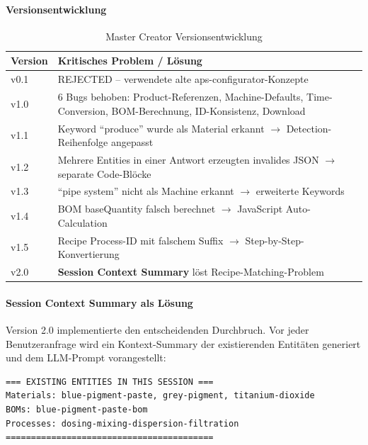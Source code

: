 \paragraph{Versionsentwicklung}

\begin{table}[h]
\centering
\caption{Master Creator Versionsentwicklung}
\label{tab:MasterCreatorVersions}
\begin{tabular}{lp{10cm}}
\hline
\textbf{Version} & \textbf{Kritisches Problem / Lösung} \\
\hline
v0.1 & REJECTED -- verwendete alte aps-configurator-Konzepte \\
v1.0 & 6 Bugs behoben: Product-Referenzen, Machine-Defaults, Time-Conversion, BOM-Berechnung, ID-Konsistenz, Download \\
v1.1 & Keyword ``produce'' wurde als Material erkannt $\rightarrow$ Detection-Reihenfolge angepasst \\
v1.2 & Mehrere Entities in einer Antwort erzeugten invalides JSON $\rightarrow$ separate Code-Blöcke \\
v1.3 & ``pipe system'' nicht als Machine erkannt $\rightarrow$ erweiterte Keywords \\
v1.4 & BOM baseQuantity falsch berechnet $\rightarrow$ JavaScript Auto-Calculation \\
v1.5 & Recipe Process-ID mit falschem Suffix $\rightarrow$ Step-by-Step-Konvertierung \\
v2.0 & \textbf{Session Context Summary} löst Recipe-Matching-Problem \\
\hline
\end{tabular}
\end{table}

\paragraph{Session Context Summary als Lösung}

Version 2.0 implementierte den entscheidenden Durchbruch. Vor jeder Benutzeranfrage wird ein Kontext-Summary der existierenden Entitäten generiert und dem LLM-Prompt vorangestellt:

\begin{verbatim}
=== EXISTING ENTITIES IN THIS SESSION ===
Materials: blue-pigment-paste, grey-pigment, titanium-dioxide
BOMs: blue-pigment-paste-bom
Processes: dosing-mixing-dispersion-filtration
=========================================
\end{verbatim}

